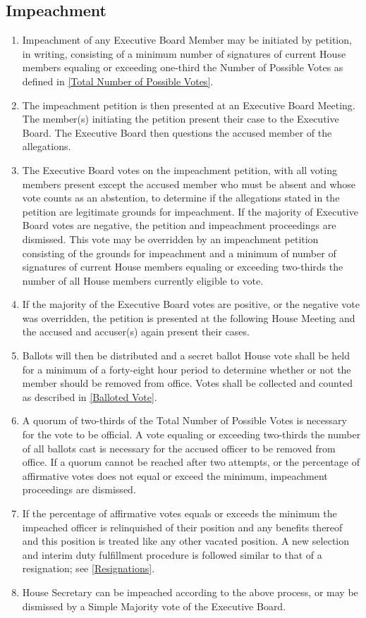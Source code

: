 \documentclass{article}
\newcommand{\asection}[1]{\subsection{#1} \label{#1}}
\begin{document}
\asection{Impeachment}
\begin{enumerate}
	\item Impeachment of any Executive Board Member may be initiated by petition, in writing, consisting of a minimum number of signatures of current House members equaling or exceeding one-third the Number of Possible Votes as defined in \ref{Total Number of Possible Votes}.
	\item The impeachment petition is then presented at an Executive Board Meeting.
		The member(s) initiating the petition present their case to the Executive Board.
		The Executive Board then questions the accused member of the allegations.
	\item The Executive Board votes on the impeachment petition, with all voting members present except the accused member who must be absent and whose vote counts as an abstention, to determine if the allegations stated in the petition are legitimate grounds for impeachment.
		If the majority of Executive Board votes are negative, the petition and impeachment proceedings are dismissed.
		This vote may be overridden by an impeachment petition consisting of the grounds for impeachment and a minimum of number of signatures of current House members equaling or exceeding two-thirds the number of all House members currently eligible to vote.
	\item If the majority of the Executive Board votes are positive, or the negative vote was overridden, the petition is presented at the following House Meeting and the accused and accuser(s) again present their cases.
	\item Ballots will then be distributed and a secret ballot House vote shall be held for a minimum of a forty-eight hour period to determine whether or not the member should be removed from office.
		Votes shall be collected and counted as described in \ref{Balloted Vote}.
	\item A quorum of two-thirds of the Total Number of Possible Votes is necessary for the vote to be official.
		A vote equaling or exceeding two-thirds the number of all ballots cast is necessary for the accused officer to be removed from office.
		If a quorum cannot be reached after two attempts, or the percentage of affirmative votes does not equal or exceed the minimum, impeachment proceedings are dismissed.
	\item If the percentage of affirmative votes equals or exceeds the minimum the impeached officer is relinquished of their position and any benefits thereof and this position is treated like any other vacated position.
		A new selection and interim duty fulfillment procedure is followed similar to that of a resignation; see \ref{Resignations}.
	\item House Secretary can be impeached according to the above process, or may be dismissed by a Simple Majority vote of the Executive Board.
\end{enumerate}
\end{document}
